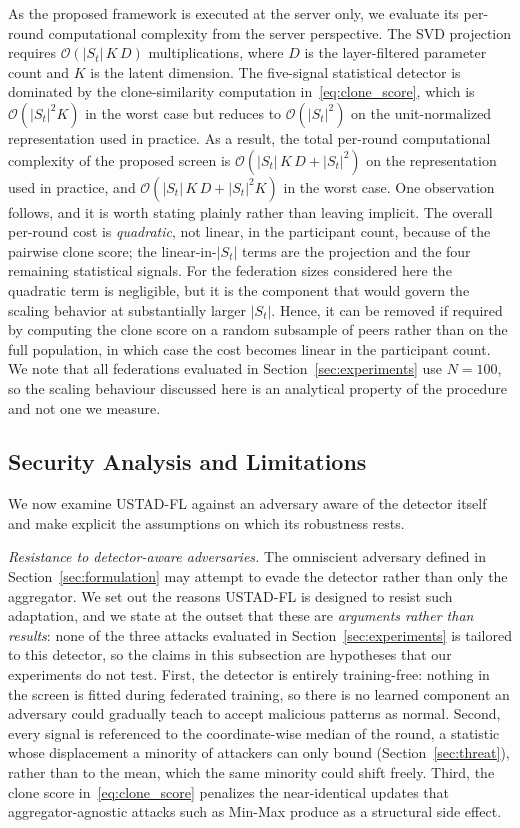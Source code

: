 \documentclass[journal]{IEEEtran}
\begin{document}
As the proposed framework is executed at the server only, we evaluate its per-round computational complexity from the server perspective. The SVD projection requires $\mathcal{O}(|S_t|\,K\,D)$ multiplications, where $D$ is the layer-filtered parameter count and $K$ is the latent dimension. The five-signal statistical detector is dominated by the clone-similarity computation in~\eqref{eq:clone_score}, which is $\mathcal{O}(|S_t|^2 K)$ in the worst case but reduces to $\mathcal{O}(|S_t|^2)$ on the unit-normalized representation used in practice. As a result, the total per-round computational complexity of the proposed screen is
$\mathcal{O}(|S_t|\,K\,D + |S_t|^2)$ on the representation used in practice, and
$\mathcal{O}(|S_t|\,K\,D + |S_t|^2 K)$ in the worst case. One observation follows, and it is
worth stating plainly rather than leaving implicit. The overall per-round cost is
\emph{quadratic}, not linear, in the participant count, because of the pairwise clone score;
the linear-in-$|S_t|$ terms are the projection and the four remaining statistical signals. For
the federation sizes considered here the quadratic term is negligible, but it is the component
that would govern the scaling behavior at substantially larger $|S_t|$. Hence, it can be
removed if required by computing the clone score on a random subsample of peers rather than on
the full population, in which case the cost becomes linear in the participant count. We note
that all federations evaluated in Section~\ref{sec:experiments} use $N = 100$, so the scaling
behaviour discussed here is an analytical property of the procedure and not one we measure.

\subsection{Security Analysis and Limitations}
\label{sec:security}
We now examine USTAD-FL against an adversary aware of the detector itself and make explicit the assumptions on which its robustness rests.

\noindent\textit{Resistance to detector-aware adversaries.} The omniscient adversary defined in Section~\ref{sec:formulation} may attempt to evade the detector rather than only the aggregator. We set out the reasons USTAD-FL is designed to resist such adaptation, and we state at the outset that these are \emph{arguments rather than results}: none of the three attacks evaluated in Section~\ref{sec:experiments} is tailored to this detector, so the claims in this subsection are hypotheses that our experiments do not test. First, the detector is entirely training-free: nothing in the screen is fitted during federated training, so there is no learned component an adversary could gradually teach to accept malicious patterns as normal. Second, every signal is referenced to the coordinate-wise median of the round, a statistic whose displacement a minority of attackers can only bound (Section~\ref{sec:threat}), rather than to the mean, which the same minority could shift freely. Third, the clone score in~\eqref{eq:clone_score} penalizes the near-identical updates that aggregator-agnostic attacks such as Min-Max produce as a structural side effect.
\end{document}
